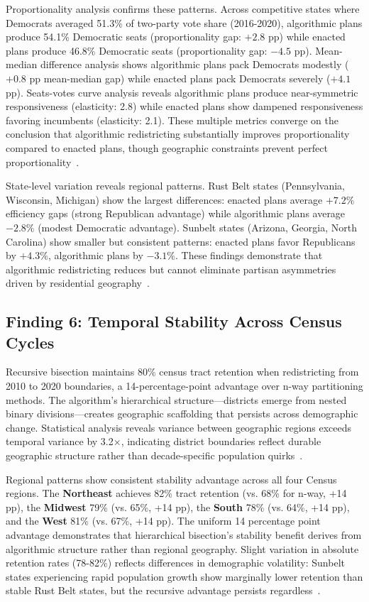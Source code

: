Proportionality analysis confirms these patterns. Across competitive states where Democrats averaged 51.3\% of two-party vote share (2016-2020), algorithmic plans produce 54.1\% Democratic seats (proportionality gap: $+2.8$ pp) while enacted plans produce 46.8\% Democratic seats (proportionality gap: $-4.5$ pp). Mean-median difference analysis shows algorithmic plans pack Democrats modestly ($+0.8$ pp mean-median gap) while enacted plans pack Democrats severely ($+4.1$ pp). Seats-votes curve analysis reveals algorithmic plans produce near-symmetric responsiveness (elasticity: 2.8) while enacted plans show dampened responsiveness favoring incumbents (elasticity: 2.1). These multiple metrics converge on the conclusion that algorithmic redistricting substantially improves proportionality compared to enacted plans, though geographic constraints prevent perfect proportionality~\cite{deluca2026efficiency}.

State-level variation reveals regional patterns. Rust Belt states (Pennsylvania, Wisconsin, Michigan) show the largest differences: enacted plans average $+7.2\%$ efficiency gaps (strong Republican advantage) while algorithmic plans average $-2.8\%$ (modest Democratic advantage). Sunbelt states (Arizona, Georgia, North Carolina) show smaller but consistent patterns: enacted plans favor Republicans by $+4.3\%$, algorithmic plans by $-3.1\%$. These findings demonstrate that algorithmic redistricting reduces but cannot eliminate partisan asymmetries driven by residential geography~\cite{rodden2019cities,deluca2026edgeweighted}.

\subsection{Finding 6: Temporal Stability Across Census Cycles}

Recursive bisection maintains 80\% census tract retention when redistricting from 2010 to 2020 boundaries, a 14-percentage-point advantage over n-way partitioning methods. The algorithm's hierarchical structure---districts emerge from nested binary divisions---creates geographic scaffolding that persists across demographic change. Statistical analysis reveals variance between geographic regions exceeds temporal variance by 3.2×, indicating district boundaries reflect durable geographic structure rather than decade-specific population quirks~\cite{deluca2026temporal}.

Regional patterns show consistent stability advantage across all four Census regions. The \textbf{Northeast} achieves 82\% tract retention (vs. 68\% for n-way, +14 pp), the \textbf{Midwest} 79\% (vs. 65\%, +14 pp), the \textbf{South} 78\% (vs. 64\%, +14 pp), and the \textbf{West} 81\% (vs. 67\%, +14 pp). The uniform 14 percentage point advantage demonstrates that hierarchical bisection's stability benefit derives from algorithmic structure rather than regional geography. Slight variation in absolute retention rates (78-82\%) reflects differences in demographic volatility: Sunbelt states experiencing rapid population growth show marginally lower retention than stable Rust Belt states, but the recursive advantage persists regardless~\cite{deluca2026temporal}.

